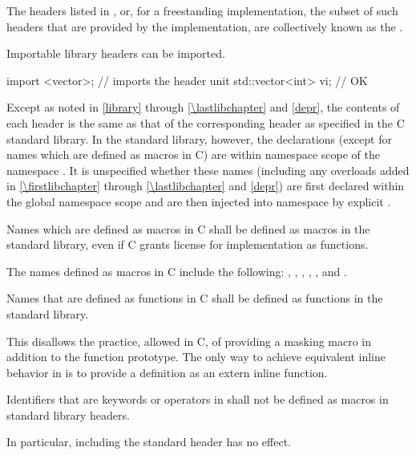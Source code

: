 \pnum
The headers listed in , or,
for a freestanding implementation,
the subset of such headers that are provided by the implementation,
are collectively known as
the .
\begin{note}
Importable \Cpp{} library headers can be
imported.
\end{note}
\begin{example}
\begin{codeblock}
import <vector>;                // imports the  header unit
std::vector<int> vi;            // OK
\end{codeblock}
\end{example}

\pnum
Except as noted in \ref{library} through \ref{\lastlibchapter}
and \ref{depr}, the contents of each header  is
the same as that of the corresponding header  as
specified in the C standard library.
In the \Cpp{} standard library, however, the
declarations (except for names which are defined as macros in C) are within
namespace scope of the namespace .
It is unspecified whether these names (including any overloads added in
\ref{\firstlibchapter} through \ref{\lastlibchapter} and \ref{depr})
are first declared within the global namespace scope
and are then injected into namespace  by explicit
.

\pnum
Names which are defined as macros in C shall be defined as macros in the \Cpp{}
standard library, even if C grants license for implementation as functions.
\begin{note}
The names defined as macros in C include the following:
, , , ,
, and .
\end{note}

\pnum
Names that are defined as functions in C shall be defined as functions in the
\Cpp{} standard library.
\begin{footnote}
This disallows the practice, allowed in C, of
providing a masking macro in addition to the function prototype. The only way to
achieve equivalent inline behavior in \Cpp{} is to provide a definition as an
extern inline function.
\end{footnote}

\pnum
Identifiers that are keywords or operators in \Cpp{} shall not be defined as
macros in \Cpp{} standard library headers.
\begin{footnote}
In particular, including the
standard header  has no effect.
\end{footnote}

